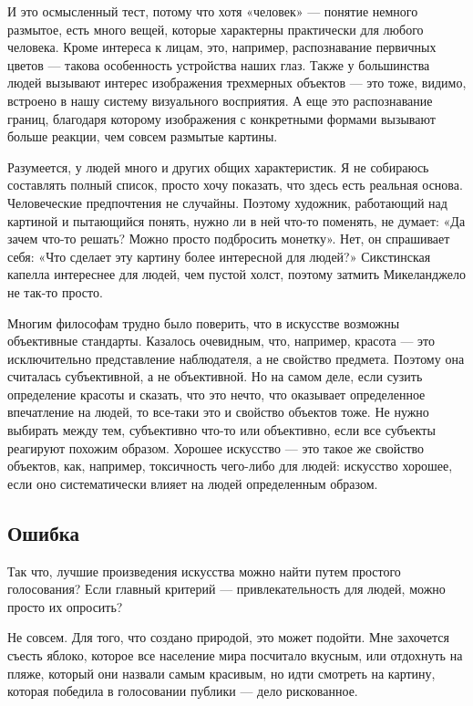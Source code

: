 \documentclass[ebook,12pt,oneside,openany]{memoir}
\begin{document}
И это осмысленный тест, потому что хотя «человек» — понятие немного
размытое, есть много вещей, которые характерны практически для любого
человека. Кроме интереса к лицам, это, например, распознавание
первичных цветов — такова особенность устройства наших глаз. Также у
большинства людей вызывают интерес изображения трехмерных объектов —
это тоже, видимо, встроено в нашу систему визуального восприятия. А
еще это распознавание границ, благодаря которому изображения с
конкретными формами вызывают больше реакции, чем совсем размытые
картины. \newline

Разумеется, у людей много и других общих характеристик. Я не собираюсь
составлять полный список, просто хочу показать, что здесь есть
реальная основа. Человеческие предпочтения не случайны. Поэтому
художник, работающий над картиной и пытающийся понять, нужно ли в ней
что-то поменять, не думает: «Да зачем что-то решать? Можно просто
подбросить монетку». Нет, он спрашивает себя: «Что сделает эту картину
более интересной для людей?» Сикстинская капелла интереснее для людей,
чем пустой холст, поэтому затмить Микеланджело не так-то просто. \newline

Многим философам трудно было поверить, что в искусстве возможны
объективные стандарты. Казалось очевидным, что, например, красота —
это исключительно представление наблюдателя, а не свойство предмета.
Поэтому она считалась субъективной, а не объективной. Но на самом
деле, если сузить определение красоты и сказать, что это нечто, что
оказывает определенное впечатление на людей, то все-таки это и
свойство объектов тоже. Не нужно выбирать между тем, субъективно
что-то или объективно, если все субъекты реагируют похожим образом.
Хорошее искусство — это такое же свойство объектов, как, например,
токсичность чего-либо для людей: искусство хорошее, если оно
систематически влияет на людей определенным образом. \newline

\subsection{Ошибка}

Так что, лучшие произведения искусства можно найти путем
простого голосования? Если главный критерий — привлекательность для
людей, можно просто их опросить? \newline

Не совсем. Для того, что создано природой, это может подойти. Мне
захочется съесть яблоко, которое все население мира посчитало вкусным,
или отдохнуть на пляже, который они назвали самым красивым, но идти
смотреть на картину, которая победила в голосовании публики — дело
рискованное. \newline
\end{document}
